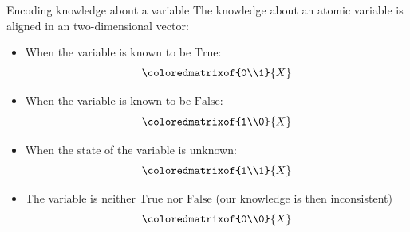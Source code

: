 \documentclass{beamer}
\begin{document}
    \begin{frame}{Encoding knowledge about a variable}
        The knowledge about an atomic variable is aligned in an two-dimensional vector:
        \begin{itemize}
            \item When the variable is known to be $\mathrm{True}$:
            \begin{align*}
                \coloredmatrixof{0\\1}{\catvariable}
            \end{align*}
            \item When the variable is known to be $\mathrm{False}$:
            \begin{align*}
                \coloredmatrixof{1\\0}{\catvariable}
            \end{align*}
            \item When the state of the variable is unknown:
            \begin{align*}
                \coloredmatrixof{1\\1}{\catvariable}
            \end{align*}
            \item The variable is neither $\mathrm{True}$ nor $\mathrm{False}$ (our knowledge is then inconsistent)
            \begin{align*}
                \coloredmatrixof{0\\0}{\catvariable}
            \end{align*}
        \end{itemize}
    \end{frame}
\end{document}
